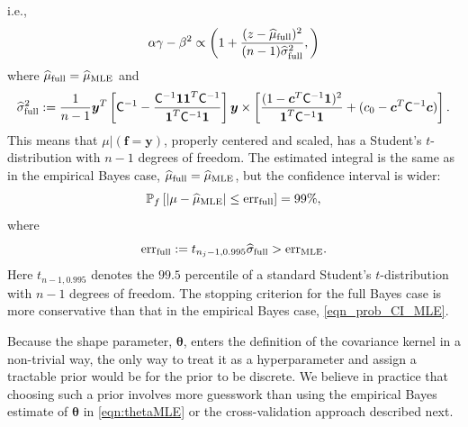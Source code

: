 \documentclass{iitthesis}          %
\newcommand{\bm}[1]{\boldsymbol{#1}}
\newcommand{\vtheta}{{\bm{\theta}}}
\newcommand{\vc}{\bm{c}}
\newcommand{\vf}{\bm{f}}
\newcommand{\vy}{\bm{y}}
\newcommand{\vone}{\bm{1}}
\newcommand{\mC}{\mathsf{C}}
\newcommand{\hmu}{\widehat{\mu}}
\newcommand{\hsigma}{\widehat{\sigma}}
\newcommand{\MLE}{\textup{MLE}}
\newcommand{\err}{\textup{err}}
\begin{document}
i.e.,
\begin{align*}
\alpha \gamma - \beta^2 \propto 
\left(
1 +  \frac{(z - \hmu_{\textup{full}})^2}{(n-1)\widehat{\sigma}_{\textup{full}}^2}, 
\right)
\end{align*}
where $\hmu_{\textup{full}} = \hmu_{\MLE}$ and 
\begin{multline*}
\hsigma^2_{\textup{full}} 
:= \frac{1}{n-1}
\vy^T\left[ \mC^{-1} 
- \frac{ \mC^{-1} \vone\vone^T \mC^{-1}}{\vone^T \mC^{-1} \vone}  \right]\vy
\times  \left[\frac{(1 - \vc^T \mC^{-1} \vone)^2}{\vone^T \mC^{-1} \vone} + (c_0  -\vc ^T \mC^{-1} \vc) \right].
\end{multline*}
This means that $\mu \vert (\vf = \vy )$, properly centered and scaled, has a Student's $t$-distribution with $n-1$ degrees of freedom.   The estimated integral is the same as in the empirical Bayes case, $\hmu_{\textup{full}} = \hmu_{\MLE}$, but the confidence interval is wider:
\begin{equation}
\label{eqn_prob_CI_full}
\mathbb{P}_f \left[
|\mu-\hmu_\MLE| \leq \err_{\textup{full}} \right]  = 99\%,
\end{equation}
where
\begin{equation}
\label{FJH:eq:errFull}
\err_{\textup{full}} 
:= t_{n_j-1,0.995} \hsigma_{\textup{full}} > \err_\MLE .
\end{equation}
Here $t_{n-1,0.995}$ denotes the $99.5$ percentile of a standard Student's $t$-distribution with $n-1$ degrees of freedom. The stopping criterion for the full Bayes case is more conservative than that in the empirical Bayes case, \eqref{eqn_prob_CI_MLE}.

Because the shape parameter, $\vtheta$, enters the definition of the covariance kernel in a non-trivial way, the only way to treat it as a hyperparameter and assign a tractable prior would be for the prior to be discrete.  We believe in practice that choosing such a prior involves more guesswork than using the empirical Bayes estimate of $\vtheta$ in \eqref{eqn:thetaMLE} or the cross-validation approach described next.

\end{document}
